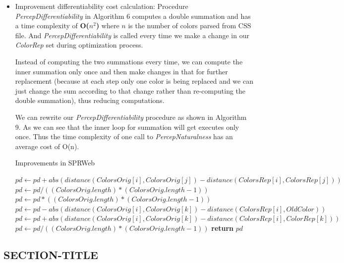 \begin{itemize}
\item {Improvement differentiability cost calculation:}  Procedure \textit{PercepDifferentiability} in Algorithm 6 computes a double summation and has a time complexity of \textbf{O($n^{2}$)} where $n$ is the number of colors parsed from CSS file. And \textit{PercepDifferentiability} is called every time we make a change in our \textit{ColorRep} set during optimization process.


Instead of computing the two summations every time, we can compute the inner summation only once and then make changes in that for further replacement (because at each step only one color is being replaced and we can just change the sum according to that change rather than re-computing the double summation), thus reducing computations.

We can rewrite our \textit{PercepDifferentiability} procedure as shown in Algorithm 9. As we can see that the inner  loop for summation will get executes only once. Thus the time complexity of one call to \textit{PercepNaturalness} has an average cost of
O(n).


\begin{algorithm}[!htb]
\caption{Improvements in SPRWeb}\label{Improvements differentiability}
\begin{algorithmic}[1]
 
  
				\State $pd \gets pd + abs(distance(ColorsOrig[i],ColorsOrig[j]) - distance(ColorsRep[i],ColorsRep[j]))$
			\EndFor
		\EndFor
		\State $pd \gets pd/((ColorsOrig.length)*(ColorsOrig.length-1))$
\Else 
\State $pd \gets pd*((ColorsOrig.length)*(ColorsOrig.length-1))$
	\State $pd  \gets pd - abs(distance(ColorsOrig[i],ColorsOrig[k]) - distance(ColorsRep[i],OldColor))$
	\State $pd  \gets pd + abs(distance(ColorsOrig[i],ColorsOrig[k]) - distance(ColorsRep[i],ColorRep[k]))$
\EndFor
\State $pd \gets pd/((ColorsOrig.length)*(ColorsOrig.length-1))$
\EndIf
\State \textbf{return} $pd$
\EndProcedure
\end{algorithmic}
\end{algorithm}


\end{itemize}

\subsection{SECTION-TITLE}
\label{SECTION-LABEL}